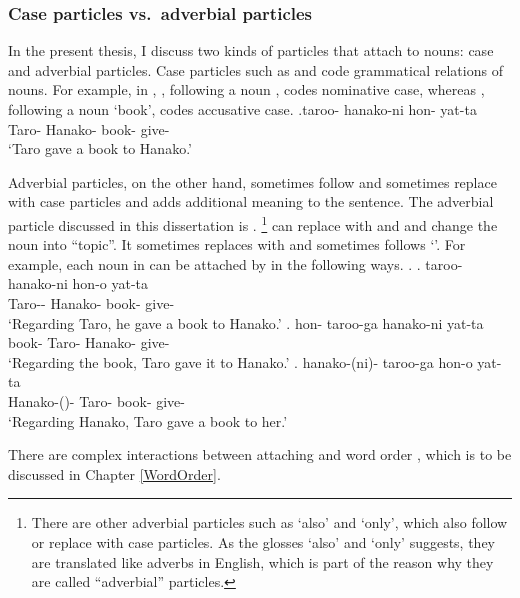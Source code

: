 \subsubsection{Case particles vs.~adverbial particles}

In the present thesis,
I discuss two kinds of particles that attach to nouns:
case and adverbial particles.
Case particles such as  and 
code grammatical relations of nouns.
For example, in \Next,
, following a noun , codes nominative case,
whereas , following a noun  `book', codes accusative case.
%
\exg.\label{ExShibatani90257}taroo- hanako-ni hon- yat-ta \\
        Taro- Hanako- book- give- \\
        `Taro gave a book to Hanako.'
  \hfill{\cite[pp.~257]{shibatani90}}


Adverbial particles, on the other hand,
sometimes follow and sometimes replace with case particles
and adds additional meaning to the sentence.
The adverbial particle discussed in this dissertation is .%
 \footnote{
 There are other adverbial particles such as  `also' and  `only',
 which also follow or replace with case particles.
 As the glosses `also' and `only' suggests,
 they are translated like adverbs in English,
 which is part of the reason why they are called ``adverbial'' particles.
 }
 can replace with  and  and change the noun into ``topic''.
It sometimes replaces with and sometimes follows  `'.
For example,
each noun in \Last can be attached by  in the following ways.
%
\ex. \ag. taroo- hanako-ni hon-o yat-ta \\
        Taro-- Hanako- book- give- \\
        `Regarding Taro, he gave a book to Hanako.'
 \bg. hon- taroo-{ga} hanako-ni yat-ta \\
      book- Taro- Hanako- give- \\
        `Regarding the book, Taro gave it to Hanako.'
 \bg. hanako-(ni)- taroo-{ga} hon-o yat-ta \\
      Hanako-()- Taro- book- give- \\
        `Regarding Hanako, Taro gave a book to her.'

There are complex interactions between  attaching and word order \cite[e.g.,][]{kuroda79},
which is to be discussed in Chapter \ref{WordOrder}.


